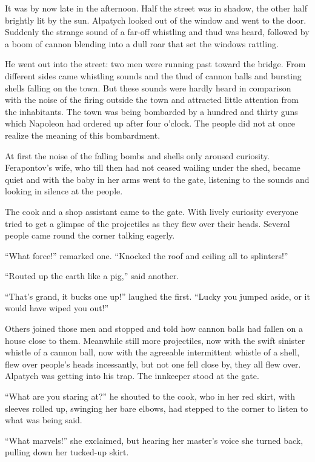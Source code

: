 It was by now late in the afternoon. Half the street was in
shadow, the other half brightly lit by the sun. Alpatych looked
out of the window and went to the door. Suddenly the strange
sound of a far-off whistling and thud was heard, followed by a
boom of cannon blending into a dull roar that set the windows
rattling.

He went out into the street: two men were running past toward the
bridge. From different sides came whistling sounds and the thud
of cannon balls and bursting shells falling on the town. But
these sounds were hardly heard in comparison with the noise of
the firing outside the town and attracted little attention from
the inhabitants. The town was being bombarded by a hundred and
thirty guns which Napoleon had ordered up after four o'clock. The
people did not at once realize the meaning of this bombardment.

At first the noise of the falling bombs and shells only aroused
curiosity. Ferapontov's wife, who till then had not ceased
wailing under the shed, became quiet and with the baby in her
arms went to the gate, listening to the sounds and looking in
silence at the people.

The cook and a shop assistant came to the gate. With lively
curiosity everyone tried to get a glimpse of the projectiles as
they flew over their heads. Several people came round the corner
talking eagerly.

``What force!'' remarked one. ``Knocked the roof and ceiling all
to splinters!''

``Routed up the earth like a pig,'' said another.

``That's grand, it bucks one up!'' laughed the first. ``Lucky you
jumped aside, or it would have wiped you out!''

Others joined those men and stopped and told how cannon balls had
fallen on a house close to them. Meanwhile still more
projectiles, now with the swift sinister whistle of a cannon
ball, now with the agreeable intermittent whistle of a shell,
flew over people's heads incessantly, but not one fell close by,
they all flew over. Alpatych was getting into his trap. The
innkeeper stood at the gate.

``What are you staring at?'' he shouted to the cook, who in her
red skirt, with sleeves rolled up, swinging her bare elbows, had
stepped to the corner to listen to what was being said.

``What marvels!'' she exclaimed, but hearing her master's voice
she turned back, pulling down her tucked-up skirt.

